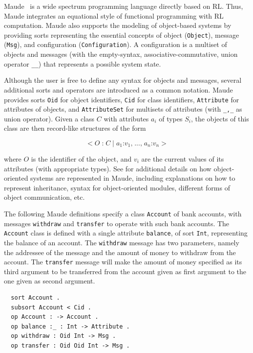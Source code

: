 Maude~\cite{CDELMMQ:02,CDELMMT:07-book} is a
wide spectrum programming language directly based on RL.
Thus, Maude integrates an
equational style of functional programming with RL computation.
Maude also supports the modeling of object-based systems by providing
sorts representing the essential concepts of object
(\texttt{Object}), message (\texttt{Msg}), and configuration
(\texttt{Configuration}). A configuration is a multiset of objects
and messages (with the empty-syntax, associative-commutative, union
operator \verb~__~) that represents a possible system
state.

Although the user is free to define any syntax for objects
and messages, several additional sorts and operators are introduced
as a common notation. Maude provides sorts \texttt{Oid} for object
identifiers, \texttt{Cid} for class identifiers, \texttt{Attribute}
for attributes of objects, and \texttt{AttributeSet} for multisets
of attributes (with \verb~_,_~ as union operator).
Given a class $C$ with attributes $a_i$ of types $S_i$, the objects
of this class are then record-like structures of the form

$$\texttt{<} \; O \; \texttt{:} \; C \; \texttt{|} \; a_1 \texttt{:}
v_1 \texttt{,} \; ... \texttt{,} \; a_n \texttt{:} v_n \;
\texttt{>}$$

\noindent where $O$ is the identifier of the object, and $v_i$
are the current values of its attributes (with appropriate types).
See \cite{CDELMMT:07-book} for additional details on how
object-oriented systems are represented in Maude, including
explanations on how to represent inheritance, syntax for
object-oriented modules, different forms of object communication,
etc.

The following Maude definitions specify a class
\texttt{Account} of bank accounts, with messages \verb"withdraw" and
\verb"transfer" to operate with such bank accounts. The
\verb"Account" class is defined with a single attribute
\verb"balance", of sort \verb"Int", representing the balance of an
account. The \verb"withdraw" message has two parameters, namely the
addressee of the message and the amount of money to withdraw from
the account. The \verb"transfer" message will make the amount of
money specified as its third argument to be transferred from the
account given as first argument to the one given as second argument.

{\small
\begin{verbatim}
  sort Account .
  subsort Account < Cid .
  op Account : -> Account .
  op balance :_ : Int -> Attribute .
  op withdraw : Oid Int -> Msg .
  op transfer : Oid Oid Int -> Msg .
\end{verbatim}
}

